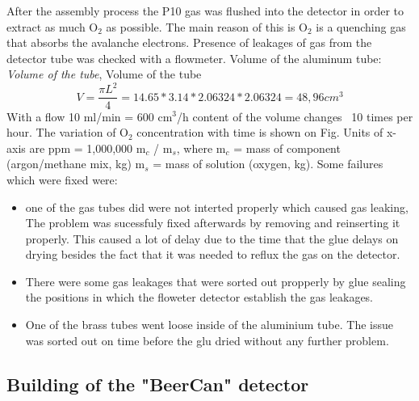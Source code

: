 After the assembly process the P10 gas was flushed into the detector in order to
extract as much O$_2$ as possible. The main reason of this is O$_2$ is a
quenching gas that absorbs the avalanche electrons.  Presence of leakages of gas
from the detector tube was checked with a flowmeter. Volume of the aluminum
tube: \emph{Volume of the tube}, Volume of the tube
\begin{equation}
  \label{eq:tube_volume}
  V=\frac{\pi L^2}{4} =14.65*3.14*2.06324*2.06324=48,96 cm^3
\end{equation}
With a flow 10 ml/min = 600 cm$^3$/h content of the volume changes ~10 times per
hour. The variation of O$_{2}$ concentration with time is shown on Fig.  Units
of x-axis are ppm = 1,000,000 m$_{c}$ / m$_{s}$, where m$_{c}$ = mass of
component (argon/methane mix, kg) m$_{s}$ = mass of solution (oxygen, kg).  Some
failures which were fixed were:
\begin{itemize}
\item one of the gas tubes did were not interted properly which caused gas
  leaking, The problem was sucessfuly fixed afterwards by removing and
  reinserting it properly.  This caused a lot of delay due to the time that the
  glue delays on drying besides the fact that it was needed to reflux the gas on
  the detector.
\item There were some gas leakages that were sorted out propperly by glue
  sealing the positions in which the floweter detector establish the gas
  leakages.
\item One of the brass tubes went loose inside of the aluminium tube. The issue
  was sorted out on time before the glu dried without any further problem.
\end{itemize}

\subsection{Building of the "BeerCan" detector}
\label{sec:building_beercan}

